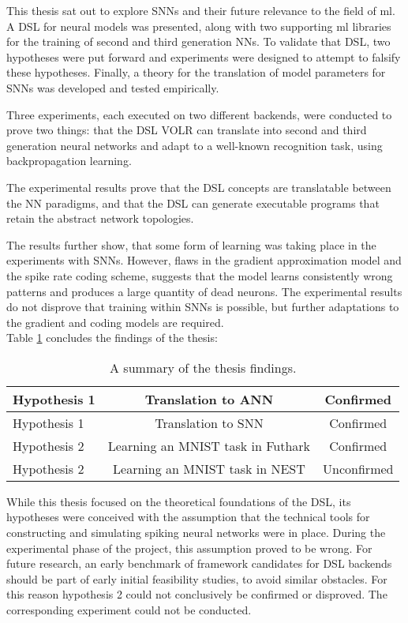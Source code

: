 \documentclass[report.tex]{subfiles}
\begin{document}
This thesis sat out to explore \glspl{SNN} and their future relevance to the field of
\gls{ml}.
A \gls{DSL} for neural models was presented, along with two
supporting \gls{ml} libraries for the training of second and third generation
\glspl{NN}. 
To validate that \gls{DSL}, two hypotheses were put forward and experiments were
designed to attempt to falsify these hypotheses.
Finally, a theory for the translation of model parameters for \glspl{SNN} was
developed and tested empirically.

Three experiments, each executed on two different backends, were conducted to
prove two things: that the \gls{DSL} VOLR can translate into second and third
generation neural networks and adapt to a well-known recognition task, using
backpropagation learning.

The experimental results prove that the \gls{DSL} concepts are
translatable between the \gls{NN} paradigms, and that the \gls{DSL} can generate
executable programs that retain the abstract network topologies.

The results further show, that some form of learning was taking place in the
experiments with \glspl{SNN}.
However, flaws in the gradient approximation model and the spike rate coding
scheme, suggests that the model learns consistently wrong patterns and produces a
large quantity of dead neurons.
The experimental results do not disprove that training within \glspl{SNN} is possible,
but further adaptations to the gradient and coding models are required.
\\[0.1cm]

Table \ref{tab:findings} concludes the findings of the thesis:

\def\arraystretch{1.5}
\begin{table}
  \centering
  \begin{tabular}{l c c}
     Hypothesis 1 & Translation to \gls{ANN} & Confirmed \\ \hline
     Hypothesis 1 & Translation to \gls{SNN} & Confirmed \\ \hline
     Hypothesis 2 & Learning an MNIST task in Futhark & Confirmed \\ \hline
     Hypothesis 2 & Learning an MNIST task in NEST & Unconfirmed \\ \hline
  \end{tabular}
  \caption{A summary of the thesis findings.}
  \label{tab:findings}
\end{table}

While this thesis focused on the theoretical foundations of the DSL, its hypotheses were conceived with the assumption that the
technical tools for constructing and simulating spiking neural networks were in place.
During the experimental phase of the project, this assumption proved to be wrong.
For future research, an early benchmark of framework candidates for \gls{DSL} backends
should be part of early initial feasibility studies, to avoid similar obstacles.
For this reason hypothesis 2 could not conclusively be confirmed or disproved.
The corresponding experiment could not be conducted.
\end{document}
